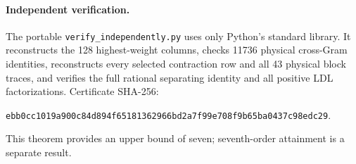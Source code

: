 \documentclass[11pt]{article}
\begin{document}
\paragraph{Independent verification.}
The portable \texttt{verify\_independently.py} uses only Python's standard library. It reconstructs the 128 highest-weight columns, checks 11736 physical cross-Gram identities, reconstructs every selected contraction row and all 43 physical block traces, and verifies the full rational separating identity and all positive LDL factorizations. Certificate SHA-256:
\begin{center}\small\texttt{ebb0cc1019a900c84d894f65181362966bd2a7f99e708f9b65ba0437c98edc29}.\end{center}
This theorem provides an upper bound of seven; seventh-order attainment is a separate result.
\end{document}
